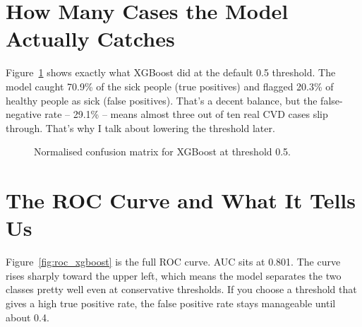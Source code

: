 \documentclass[12pt, a4paper, oneside]{book}
\begin{document}
\section{How Many Cases the Model Actually Catches}
Figure~\ref{fig:confusion_xgboost} shows exactly what XGBoost did at the default 0.5 threshold. The model caught 70.9\% of the sick people (true positives) and flagged 20.3\% of healthy people as sick (false positives). That's a decent balance, but the false-negative rate – 29.1\% – means almost three out of ten real CVD cases slip through. That's why I talk about lowering the threshold later.

\begin{figure}[H]
\centering
\vspace{12pt}
\renewcommand{\arraystretch}{1.4}
\setlength{\tabcolsep}{10pt}
\scriptsize
{}%
\vspace{12pt}
\caption{Normalised confusion matrix for XGBoost at threshold 0.5.}
\label{fig:confusion_xgboost}
\end{figure}

\section{The ROC Curve and What It Tells Us}
Figure~\ref{fig:roc_xgboost} is the full ROC curve. AUC sits at 0.801. The curve rises sharply toward the upper left, which means the model separates the two classes pretty well even at conservative thresholds. If you choose a threshold that gives a high true positive rate, the false positive rate stays manageable until about 0.4.
\end{document}
